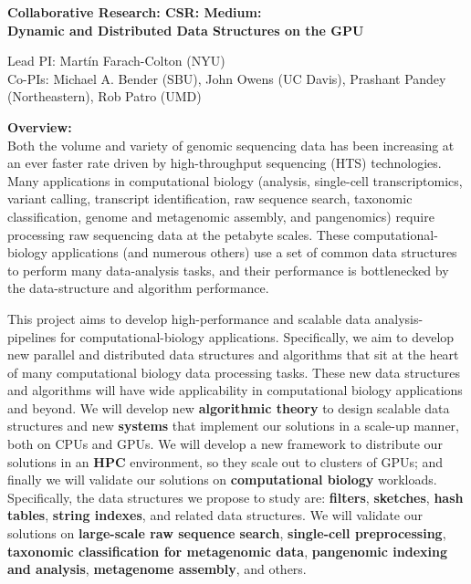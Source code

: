 
\begin{center}

\bf
\Large
Collaborative Research: CSR: Medium: \\Dynamic and Distributed Data Structures on the GPU

\small
Lead PI: Mart\'{i}n Farach-Colton (NYU) \\
Co-PIs: Michael A. Bender (SBU), John Owens (UC Davis), Prashant Pandey (Northeastern), Rob Patro (UMD)
\end{center}

\vspace{-0.3cm}
{\color{red}

\noindent \textbf{\large Overview:}\\
Both the volume and variety of genomic sequencing data has been increasing at an ever faster rate driven by high-throughput sequencing (HTS) technologies. 
Many applications in computational biology (\kmer analysis, single-cell transcriptomics, variant calling, transcript identification, raw sequence search, taxonomic classification, genome and metagenomic assembly, and pangenomics) require processing raw sequencing data at the petabyte scales.
%
These computational-biology applications (and numerous others) use a set of common data structures to perform many data-analysis tasks, and their performance is bottlenecked by the data-structure and algorithm performance.

This project aims to develop high-performance and scalable data analysis-pipelines for computational-biology applications. Specifically, we aim to develop new parallel and distributed data structures and algorithms that sit at the heart of many computational biology data processing tasks. These new data structures and algorithms will have wide applicability in computational biology applications and beyond.
%
We will develop new \textbf{algorithmic theory} to design scalable data structures and new \textbf{systems} that implement our solutions in a scale-up manner, both on CPUs and GPUs. We will develop a new framework to distribute our solutions in an \textbf{HPC} environment, so they scale out to clusters of GPUs; and finally we will validate our solutions on \textbf{computational biology} workloads.
%
Specifically, the data structures we propose to study are: \textbf{filters}, \textbf{sketches}, \textbf{hash tables}, \textbf{string indexes}, and related data structures.  We will validate our solutions on \textbf{large-scale raw sequence search}, \textbf{single-cell preprocessing}, \textbf{taxonomic classification for metagenomic data}, \textbf{pangenomic indexing and analysis}, \textbf{metagenome assembly}, and others.

}
